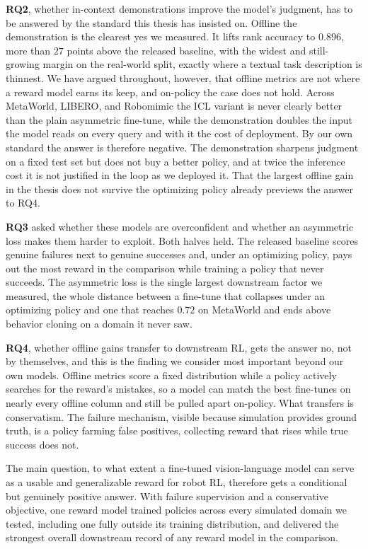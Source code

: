 \textbf{RQ2}, whether in-context demonstrations improve the model's judgment, has to be answered by the standard this thesis has insisted on. Offline the demonstration is the clearest yes we measured. It lifts rank accuracy to $0.896$, more than $27$ points above the released baseline, with the widest and still-growing margin on the real-world split, exactly where a textual task description is thinnest. We have argued throughout, however, that offline metrics are not where a reward model earns its keep, and on-policy the case does not hold. Across MetaWorld, LIBERO, and Robomimic the ICL variant is never clearly better than the plain asymmetric fine-tune, while the demonstration doubles the input the model reads on every query and with it the cost of deployment. By our own standard the answer is therefore negative. The demonstration sharpens judgment on a fixed test set but does not buy a better policy, and at twice the inference cost it is not justified in the loop as we deployed it. That the largest offline gain in the thesis does not survive the optimizing policy already previews the answer to RQ4.

\textbf{RQ3} asked whether these models are overconfident and whether an asymmetric loss makes them harder to exploit. Both halves held. The released baseline scores genuine failures next to genuine successes and, under an optimizing policy, pays out the most reward in the comparison while training a policy that never succeeds. The asymmetric loss is the single largest downstream factor we measured, the whole distance between a fine-tune that collapses under an optimizing policy and one that reaches $0.72$ on MetaWorld and ends above behavior cloning on a domain it never saw.

\textbf{RQ4}, whether offline gains transfer to downstream RL, gets the answer no, not by themselves, and this is the finding we consider most important beyond our own models. Offline metrics score a fixed distribution while a policy actively searches for the reward's mistakes, so a model can match the best fine-tunes on nearly every offline column and still be pulled apart on-policy. What transfers is conservatism. The failure mechanism, visible because simulation provides ground truth, is a policy farming false positives, collecting reward that rises while true success does not.

The main question, to what extent a fine-tuned vision-language model can serve as a usable and generalizable reward for robot RL, therefore gets a conditional but genuinely positive answer. With failure supervision and a conservative objective, one reward model trained policies across every simulated domain we tested, including one fully outside its training distribution, and delivered the strongest overall downstream record of any reward model in the comparison. 

